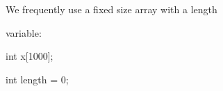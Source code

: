 We frequently use a fixed size array with a length

variable:



\begin{consolethree}[escapeinside=||]

int x[1000];

int length = 0;

\end{consolethree}

